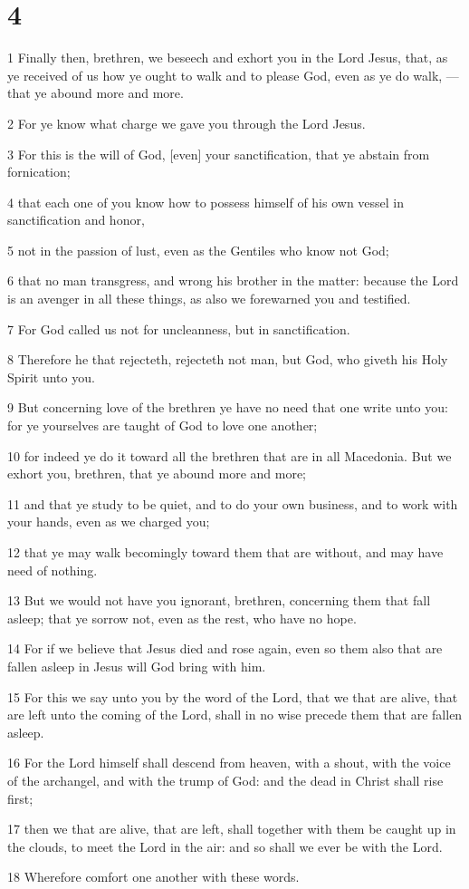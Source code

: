 \chapter{4}

\par 1 Finally then, brethren, we beseech and exhort you in the Lord Jesus, that, as ye received of us how ye ought to walk and to please God, even as ye do walk, —that ye abound more and more.
\par 2 For ye know what charge we gave you through the Lord Jesus.
\par 3 For this is the will of God, [even] your sanctification, that ye abstain from fornication;
\par 4 that each one of you know how to possess himself of his own vessel in sanctification and honor,
\par 5 not in the passion of lust, even as the Gentiles who know not God;
\par 6 that no man transgress, and wrong his brother in the matter: because the Lord is an avenger in all these things, as also we forewarned you and testified.
\par 7 For God called us not for uncleanness, but in sanctification.
\par 8 Therefore he that rejecteth, rejecteth not man, but God, who giveth his Holy Spirit unto you.
\par 9 But concerning love of the brethren ye have no need that one write unto you: for ye yourselves are taught of God to love one another;
\par 10 for indeed ye do it toward all the brethren that are in all Macedonia. But we exhort you, brethren, that ye abound more and more;
\par 11 and that ye study to be quiet, and to do your own business, and to work with your hands, even as we charged you;
\par 12 that ye may walk becomingly toward them that are without, and may have need of nothing.
\par 13 But we would not have you ignorant, brethren, concerning them that fall asleep; that ye sorrow not, even as the rest, who have no hope.
\par 14 For if we believe that Jesus died and rose again, even so them also that are fallen asleep in Jesus will God bring with him.
\par 15 For this we say unto you by the word of the Lord, that we that are alive, that are left unto the coming of the Lord, shall in no wise precede them that are fallen asleep.
\par 16 For the Lord himself shall descend from heaven, with a shout, with the voice of the archangel, and with the trump of God: and the dead in Christ shall rise first;
\par 17 then we that are alive, that are left, shall together with them be caught up in the clouds, to meet the Lord in the air: and so shall we ever be with the Lord.
\par 18 Wherefore comfort one another with these words.

